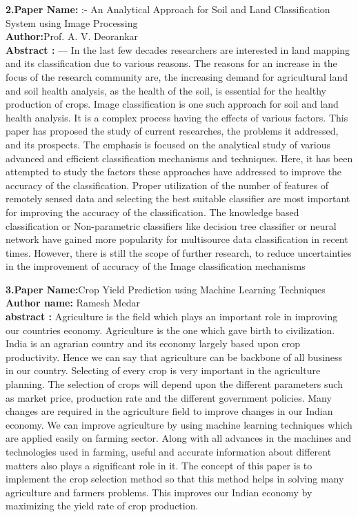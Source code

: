\documentclass[oneside,a4paper,12pt]{report}
\begin{document}
\item \textbf{ 2.Paper Name:} :- An Analytical Approach for Soil and Land 
Classification System using Image Processing \\
\textbf{Author:}Prof. A. V. Deorankar\\
\textbf{Abstract :}  — In the last few decades researchers are interested 
in land mapping and its classification due to various reasons. The 
reasons for an increase in the focus of the research community 
are, the increasing demand for agricultural land and soil health 
analysis, as the health of the soil, is essential for the healthy 
production of crops. Image classification is one such approach for
soil and land health analysis. It is a complex process having the 
effects of various factors. This paper has proposed the study of 
current researches, the problems it addressed, and its prospects. 
The emphasis is focused on the analytical study of various 
advanced and efficient classification mechanisms and techniques. 
Here, it has been attempted to study the factors these approaches 
have addressed to improve the accuracy of the classification. 
Proper utilization of the number of features of remotely sensed 
data and selecting the best suitable classifier are most important 
for improving the accuracy of the classification. The knowledgebased classification or Non-parametric classifiers like decision 
tree classifier or neural network have gained more popularity for 
multisource data classification in recent times. However, there is 
still the scope of further research, to reduce uncertainties in the 
improvement of accuracy of the Image classification mechanisms  \\ 
	
\newpage
	
\item \textbf{3.Paper Name:}Crop Yield Prediction using Machine Learning 
Techniques   \\
\textbf{Author name:} Ramesh Medar  \\
\textbf{abstract :} Agriculture is the field which plays an important 
role in improving our countries economy. Agriculture is the 
one which gave birth to civilization. India is an agrarian 
country and its economy largely based upon crop productivity. 
Hence we can say that agriculture can be backbone of all 
business in our country. Selecting of every crop is very 
important in the agriculture planning. The selection of crops 
will depend upon the different parameters such as market 
price, production rate and the different government policies. 
Many changes are required in the agriculture field to improve 
changes in our Indian economy. We can improve agriculture 
by using machine learning techniques which are applied easily 
on farming sector. Along with all advances in the machines and 
technologies used in farming, useful and accurate information 
about different matters also plays a significant role in it. The 
concept of this paper is to implement the crop selection method 
so that this method helps in solving many agriculture and 
farmers problems. This improves our Indian economy by 
maximizing the yield rate of crop production.  \\
\newpage
\end{document}
